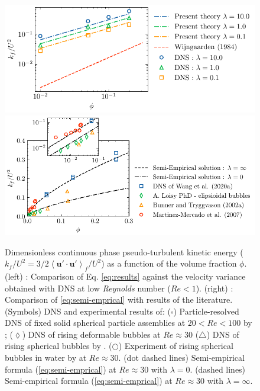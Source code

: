 \documentclass[12pt,a4paper]{article}
\newcommand{\avg}[1]{\left<#1\right>}
\renewcommand{\avg}[1]{\left<#1\right>}
\begin{document}
\begin{figure}[h!]
    \centering
    \includegraphics[height=0.20\textwidth]{image/HOMOGENEOUS_final/CA/kf_Ga_5.pdf}
    \includegraphics[height=0.25\textwidth]{image/HOMOGENEOUS_final/CA/KFliterature.pdf}
    \caption{\small
        Dimensionless continuous phase pseudo-turbulent kinetic energy ($k_f/U^2 = 3/2\avg{\textbf{u}'\cdot\textbf{u}'}_f/ U^2$) as a function of the volume fraction $\phi$.    
        (left) : Comparison of Eq. \eqref{eq:results} against the velocity variance obtained with DNS at low \textit{Reynolds} number ($Re < 1$). 
        (right) : Comparison of \ref{eq:semi-emprical} with results of the literature. (Symbols) DNS and experimental results of: 
        ($\pmb\square$)  Particle-resolved DNS
        of fixed solid spherical particle assemblies at $20< Re < 100$  by \cite{wang2021numerical}; 
        ($\pmb\lozenge$) DNS of rising deformable bubbles at $Re \approx 30$ \cite{loisy2016direct}
        ($\pmb\triangle$) DNS of rising spherical bubbles by \cite{bunner2002dynamics}. 
        ($\pmb\bigcirc$) Experiment of rising spherical bubbles in water by \cite{martinez2007measurement} at $Re \approx 30$. 
        (dot dashed lines) Semi-empirical formula (\ref{eq:semi-emprical}) at $Re \approx 30$ with $\lambda = 0$. 
        (dashed lines)  Semi-empirical formula (\ref{eq:semi-emprical}) at $Re \approx 30$ with $\lambda = \infty$.
            }
    \label{fig:wake}
\end{figure}
\end{document}
